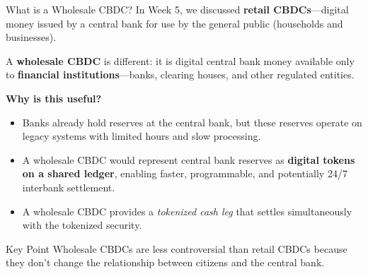 \documentclass[10pt]{beamer}
\newcommand{\highlight}[1]{\textcolor{AccentOrange}{\textbf{#1}}}
\begin{document}
\begin{frame}{What is a Wholesale CBDC?}
  In Week 5, we discussed \highlight{retail CBDCs}---digital money issued by a central bank for use by the general public (households and businesses).
  
  \vspace{0.5em}
  A \highlight{wholesale CBDC} is different: it is digital central bank money available only to \textbf{financial institutions}---banks, clearing houses, and other regulated entities.
  
  \vspace{0.5em}
  \textbf{Why is this useful?}
  \begin{itemize}
    \item Banks already hold reserves at the central bank, but these reserves operate on legacy systems with limited hours and slow processing.
    \item A wholesale CBDC would represent central bank reserves as \textbf{digital tokens on a shared ledger}, enabling faster, programmable, and potentially 24/7 interbank settlement.
    \item A wholesale CBDC provides a \textit{tokenized cash leg} that settles simultaneously with the tokenized security.
  \end{itemize}
  
  \vspace{0.3em}
  \begin{block}{Key Point}
    Wholesale CBDCs are less controversial than retail CBDCs because they don't change the relationship between citizens and the central bank.
  \end{block}
\end{frame}
\end{document}
